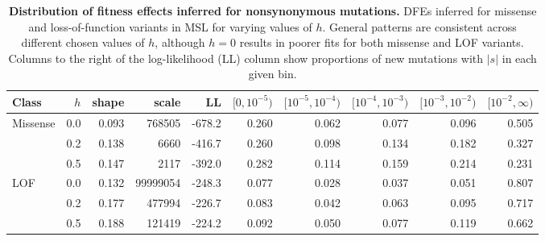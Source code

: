 \documentclass[]{article}
\begin{document}
\begin{table}
    \centering
    \small
    \begin{tabular}{lrrrrrrrrr}
        \toprule
        Class & $h$ & shape & scale & LL &
        $[0,10^{-5})$ & $[10^{-5},10^{-4})$ & $[10^{-4},10^{-3})$ &
        $[10^{-3},10^{-2})$ & $[10^{-2},\infty)$\\
        \midrule
        Missense & 0.0 & 0.093 & 768505 & -678.2 & 0.260 & 0.062 & 0.077 & 0.096 & 0.505\\
         & 0.2 & 0.138 & 6660 & -416.7 & 0.260 & 0.098 & 0.134 & 0.182 & 0.327\\
         & 0.5 & 0.147 & 2117 & -392.0 & 0.282 & 0.114 & 0.159 & 0.214 & 0.231\\
        \addlinespace
        LOF & 0.0 & 0.132 & 99999054 & -248.3 & 0.077 & 0.028 & 0.037 & 0.051 & 0.807\\
         & 0.2 & 0.177 & 477994 & -226.7 & 0.083 & 0.042 & 0.063 & 0.095 & 0.717\\
         & 0.5 & 0.188 & 121419 & -224.2 & 0.092 & 0.050 & 0.077 & 0.119 & 0.662\\
        \bottomrule
    \end{tabular}
    \caption{
        \textbf{Distribution of fitness effects inferred for nonsynonymous mutations.}
        DFEs inferred for missense and loss-of-function variants in MSL for varying
        values of $h$. General patterns are consistent across different chosen values
        of $h$, although $h=0$ results in poorer fits for both missense and LOF variants.
        Columns to the right of the log-likelihood (LL) column show proportions of
        new mutations with $|s|$ in each given bin.
    }
    \label{tab:msldfe}
\end{table}
\end{document}
